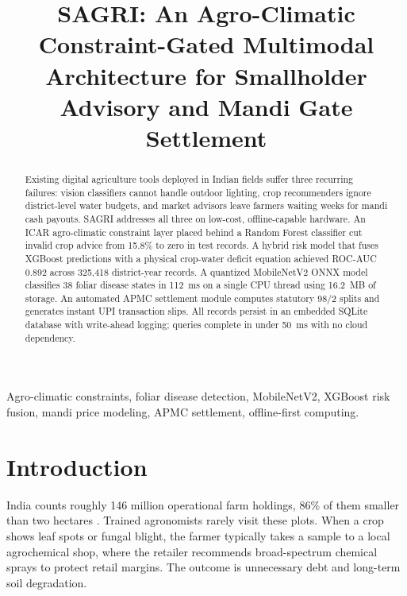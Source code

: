 \documentclass[conference]{IEEEtran}
\begin{document}
\title{SAGRI: An Agro-Climatic Constraint-Gated Multimodal Architecture for Smallholder Advisory and Mandi Gate Settlement}

\author{
}

\maketitle

\begin{abstract}
Existing digital agriculture tools deployed in Indian fields suffer three recurring failures: vision classifiers cannot handle outdoor lighting, crop recommenders ignore district-level water budgets, and market advisors leave farmers waiting weeks for mandi cash payouts. SAGRI addresses all three on low-cost, offline-capable hardware. An ICAR agro-climatic constraint layer placed behind a Random Forest classifier cut invalid crop advice from 15.8\% to zero in test records. A hybrid risk model that fuses XGBoost predictions with a physical crop-water deficit equation achieved ROC-AUC 0.892 across 325,418 district-year records. A quantized MobileNetV2 ONNX model classifies 38 foliar disease states in 112~ms on a single CPU thread using 16.2~MB of storage. An automated APMC settlement module computes statutory 98/2 splits and generates instant UPI transaction slips. All records persist in an embedded SQLite database with write-ahead logging; queries complete in under 50~ms with no cloud dependency.
\end{abstract}

\begin{IEEEkeywords}
Agro-climatic constraints, foliar disease detection, MobileNetV2, XGBoost risk fusion, mandi price modeling, APMC settlement, offline-first computing.
\end{IEEEkeywords}

\section{Introduction}
India counts roughly 146 million operational farm holdings, 86\% of them smaller than two hectares \cite{ref_nsso}. Trained agronomists rarely visit these plots. When a crop shows leaf spots or fungal blight, the farmer typically takes a sample to a local agrochemical shop, where the retailer recommends broad-spectrum chemical sprays to protect retail margins. The outcome is unnecessary debt and long-term soil degradation.
\end{document}
